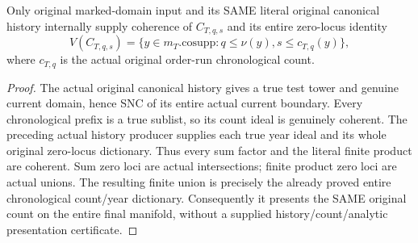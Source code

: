 \begin{theorem}
\label{hir:original-chronological-companion-count-coherent-zero-locus}
\leanok
{}
Only original marked-domain input and its SAME literal original canonical
history internally supply coherence of $C_{T,q,s}$ and its entire zero-locus
identity
\[
 V(C_{T,q,s})=\{y\in m_T.\mathrm{cosupp}:q\leq\nu(y),
                          s\leq c_{T,q}(y)\},
\]
where $c_{T,q}$ is the actual original order-run chronological count.
\end{theorem}
\begin{proof}
The actual original canonical history gives a true test tower and genuine
current domain, hence SNC of its entire actual current boundary. Every
chronological prefix is a true sublist, so its count ideal is genuinely
coherent. The preceding actual history producer supplies each true year ideal
and its whole original zero-locus dictionary. Thus every sum factor and the
literal finite product are coherent. Sum zero loci are actual intersections;
finite product zero loci are actual unions. The resulting finite union is
precisely the already proved entire chronological count/year dictionary.
Consequently it presents the SAME original count on the entire final manifold,
without a supplied history/count/analytic presentation certificate.
\end{proof}

